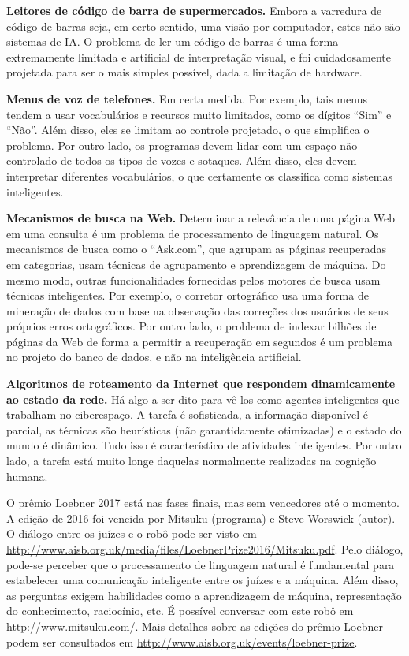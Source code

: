 \begin{solution}
\textbf{Leitores de código de barra de supermercados.} Embora a varredura de código de barras seja, em certo sentido, uma visão por computador, estes não são sistemas de IA. O problema de ler um código de barras é uma forma extremamente limitada e artificial de interpretação visual, e foi cuidadosamente projetada para ser o mais simples possível, dada a limitação de hardware.

\textbf{Menus de voz de telefones.} Em certa medida. Por exemplo, tais menus tendem a usar vocabulários e recursos muito limitados, como os dígitos ``Sim'' e ``Não''. Além disso, eles se limitam ao controle projetado, o que simplifica o problema. Por outro lado, os programas devem lidar com um espaço não controlado de todos os tipos de vozes e sotaques. Além disso, eles devem interpretar diferentes vocabulários, o que certamente os classifica como sistemas inteligentes.
	
\textbf{Mecanismos de busca na Web.} Determinar a relevância de uma página Web em uma consulta é um problema de processamento de linguagem natural. Os mecanismos de busca como o ``Ask.com'', que agrupam as páginas recuperadas em categorias, usam técnicas de agrupamento e aprendizagem de máquina. Do mesmo modo, outras funcionalidades fornecidas pelos motores de busca usam técnicas inteligentes. Por exemplo, o corretor ortográfico usa uma forma de mineração de dados com base na observação das correções dos usuários de seus próprios erros ortográficos. Por outro lado, o problema de indexar bilhões de páginas da Web de forma a permitir a recuperação em segundos é um problema no projeto do banco de dados, e não na inteligência artificial.
	
\textbf{Algoritmos de roteamento da Internet que respondem dinamicamente ao estado da rede.} Há algo a ser dito para vê-los como agentes inteligentes que trabalham no ciberespaço. A tarefa é sofisticada, a informação disponível é parcial, as técnicas são heurísticas (não garantidamente otimizadas) e o estado do mundo é dinâmico. Tudo isso é característico de atividades inteligentes. Por outro lado, a tarefa está muito longe daquelas normalmente realizadas na cognição humana.
\end{solution}

\begin{solution}
O prêmio Loebner 2017 está nas fases finais, mas sem vencedores até o momento. A edição de 2016 foi vencida por Mitsuku (programa) e Steve Worswick (autor). O diálogo entre os juízes e o robô pode ser visto em \url{http://www.aisb.org.uk/media/files/LoebnerPrize2016/Mitsuku.pdf}. Pelo diálogo, pode-se perceber que o processamento de linguagem natural é fundamental para estabelecer uma comunicação inteligente entre os juízes e a máquina. Além disso, as perguntas exigem habilidades como a aprendizagem de máquina, representação do conhecimento, raciocínio, etc. É possível conversar com este robô em \url{http://www.mitsuku.com/}. Mais detalhes sobre as edições do prêmio Loebner podem ser consultados em \url{http://www.aisb.org.uk/events/loebner-prize}.
\end{solution}

